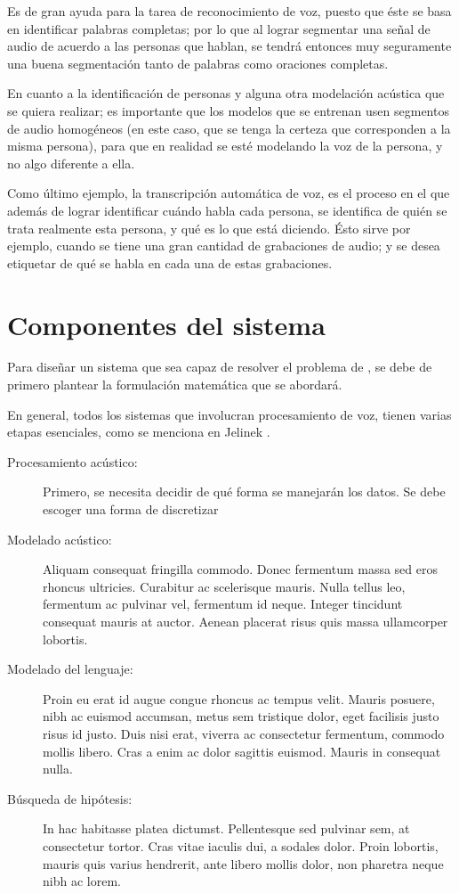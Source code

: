Es de gran ayuda para la tarea de reconocimiento de voz, puesto que éste se basa en identificar palabras completas; por lo que al lograr segmentar una señal de audio de acuerdo a las personas que hablan, se tendrá entonces muy seguramente una buena segmentación tanto de palabras como oraciones completas.

En cuanto a la identificación de personas y alguna otra modelación acústica que se quiera realizar; es importante que los modelos que se entrenan usen segmentos de audio homogéneos (en este caso, que se tenga la certeza que corresponden a la misma persona), para que en realidad se esté modelando la voz de la persona, y no algo diferente a ella.

Como último ejemplo, la transcripción automática de voz, es el proceso en el que además de lograr identificar cuándo habla cada persona, se identifica de quién se trata realmente esta persona, y qué es lo que está diciendo. Ésto sirve por ejemplo, cuando se tiene una gran cantidad de grabaciones de audio; y se desea etiquetar de qué se habla en cada una de estas grabaciones. 

\section{Componentes del sistema}

Para diseñar un sistema que sea capaz de resolver el problema de \sd, se debe de primero plantear la formulación matemática que se abordará. 

En general, todos los sistemas que involucran procesamiento de voz, tienen varias etapas esenciales, como se menciona en Jelinek \cite{Jelinek1998}. 

\begin{description}
\item[Procesamiento acústico:]
Primero, se necesita decidir de qué forma se manejarán los datos. Se debe escoger una forma de discretizar 

\item[Modelado acústico:]
 Aliquam consequat fringilla commodo. Donec fermentum massa sed eros rhoncus ultricies. Curabitur ac scelerisque mauris. Nulla tellus leo, fermentum ac pulvinar vel, fermentum id neque. Integer tincidunt consequat mauris at auctor. Aenean placerat risus quis massa ullamcorper lobortis. 
 
\item[Modelado del lenguaje:]
Proin eu erat id augue congue rhoncus ac tempus velit. Mauris posuere, nibh ac euismod accumsan, metus sem tristique dolor, eget facilisis justo risus id justo. Duis nisi erat, viverra ac consectetur fermentum, commodo mollis libero. Cras a enim ac dolor sagittis euismod. Mauris in consequat nulla. 

\item[Búsqueda de hipótesis:]
In hac habitasse platea dictumst. Pellentesque sed pulvinar sem, at consectetur tortor. Cras vitae iaculis dui, a sodales dolor. Proin lobortis, mauris quis varius hendrerit, ante libero mollis dolor, non pharetra neque nibh ac lorem.
\end{description}

